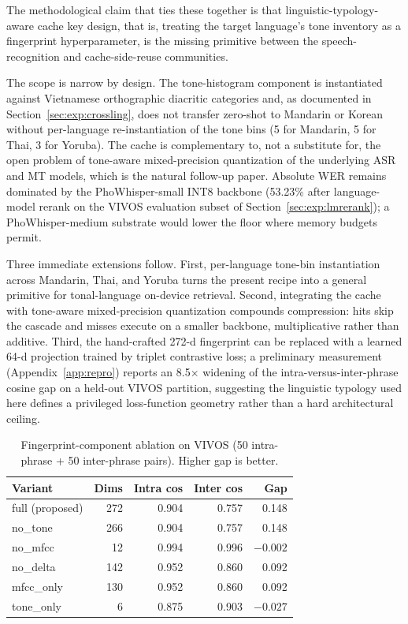 \documentclass[a4paper,fleqn]{cas-dc}
\begin{document}
The methodological claim that ties these together is that linguistic-typology-aware cache key design, that is, treating the target language's tone inventory as a fingerprint hyperparameter, is the missing primitive between the speech-recognition and cache-side-reuse communities.

The scope is narrow by design. The tone-histogram component is instantiated against Vietnamese orthographic diacritic categories and, as documented in Section~\ref{sec:exp:crossling}, does not transfer zero-shot to Mandarin or Korean without per-language re-instantiation of the tone bins (5 for Mandarin, 5 for Thai, 3 for Yoruba). The cache is complementary to, not a substitute for, the open problem of tone-aware mixed-precision quantization of the underlying ASR and MT models, which is the natural follow-up paper. Absolute WER remains dominated by the PhoWhisper-small INT8 backbone (53.23\% after language-model rerank on the VIVOS evaluation subset of Section~\ref{sec:exp:lmrerank}); a PhoWhisper-medium substrate would lower the floor where memory budgets permit.

Three immediate extensions follow. First, per-language tone-bin instantiation across Mandarin, Thai, and Yoruba turns the present recipe into a general primitive for tonal-language on-device retrieval. Second, integrating the cache with tone-aware mixed-precision quantization compounds compression: hits skip the cascade and misses execute on a smaller backbone, multiplicative rather than additive. Third, the hand-crafted 272-d fingerprint can be replaced with a learned 64-d projection trained by triplet contrastive loss; a preliminary measurement (Appendix~\ref{app:repro}) reports an 8.5$\times$ widening of the intra-versus-inter-phrase cosine gap on a held-out VIVOS partition, suggesting the linguistic typology used here defines a privileged loss-function geometry rather than a hard architectural ceiling.


\begin{table}[cols=5,pos=t]
\caption{Fingerprint-component ablation on VIVOS (50 intra-phrase + 50 inter-phrase pairs). Higher gap is better.}\label{tab:fp_ablation}
\footnotesize
\begin{tabular*}{\tblwidth}{@{}LRRRR@{}}
\toprule
Variant & Dims & Intra cos & Inter cos & Gap \\
\midrule
full (proposed) & 272 & 0.904 & 0.757 & 0.148 \\
no\_tone        & 266 & 0.904 & 0.757 & 0.148 \\
no\_mfcc        &  12 & 0.994 & 0.996 & $-0.002$ \\
no\_delta       & 142 & 0.952 & 0.860 & 0.092 \\
mfcc\_only      & 130 & 0.952 & 0.860 & 0.092 \\
tone\_only      &   6 & 0.875 & 0.903 & $-0.027$ \\
\bottomrule
\end{tabular*}
\end{table}
\end{document}
